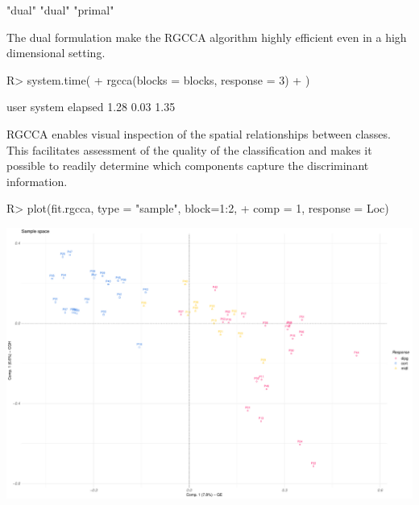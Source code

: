 \documentclass[
]{jss}
\begin{document}
\footnotesize

\begin{CodeChunk}
\begin{CodeOutput}
[1] "dual"   "dual"   "primal"
\end{CodeOutput}
\end{CodeChunk}

\normalsize

The dual formulation make the RGCCA algorithm highly efficient even in a
high dimensional setting.

\footnotesize

\begin{CodeChunk}
\begin{CodeInput}
R> system.time(
+   rgcca(blocks = blocks, response = 3)
+ )
\end{CodeInput}
\begin{CodeOutput}
   user  system elapsed 
   1.28    0.03    1.35 
\end{CodeOutput}
\end{CodeChunk}

\normalsize

RGCCA enables visual inspection of the spatial relationships between
classes. This facilitates assessment of the quality of the
classification and makes it possible to readily determine which
components capture the discriminant information.

\footnotesize

\begin{CodeChunk}
\begin{CodeInput}
R> plot(fit.rgcca, type = "sample", block=1:2,
+      comp = 1, response = Loc)
\end{CodeInput}


\begin{center}\includegraphics{RGCCA_vignette_files/figure-latex/unnamed-chunk-37-1} \end{center}

\end{CodeChunk}
\end{document}
